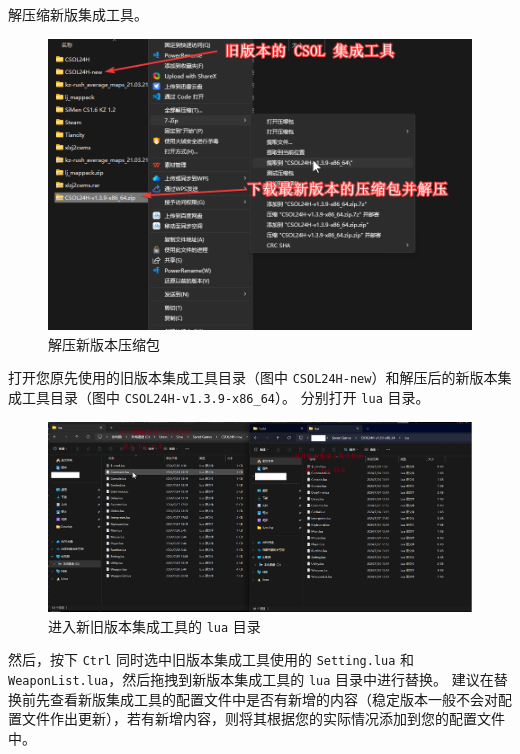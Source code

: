 解压缩新版集成工具。

\begin{figure}[H]
    \Centering
    \includegraphics[width=\textwidth]{docs/assets/update/extract_new_version.png}
    \caption{解压新版本压缩包}
\end{figure}

打开您原先使用的旧版本集成工具目录（图中 \lstinline{CSOL24H-new}）和解压后的新版本集成工具目录（图中 \lstinline{CSOL24H-v1.3.9-x86_64}）。
分别打开 \lstinline{lua} 目录。

\begin{figure}[H]
    \Centering
    \includegraphics[width=\textwidth]{docs/assets/update/replace_00.png}
    \caption{进入新旧版本集成工具的 \lstinline{lua} 目录}
\end{figure}

然后，按下 \lstinline{Ctrl} 同时选中旧版本集成工具使用的 \lstinline{Setting.lua} 和 \lstinline{WeaponList.lua}，然后拖拽到新版本集成工具的 \lstinline{lua} 目录中进行替换。
建议在替换前先查看新版集成工具的配置文件中是否有新增的内容（稳定版本一般不会对配置文件作出更新），若有新增内容，则将其根据您的实际情况添加到您的配置文件中。

